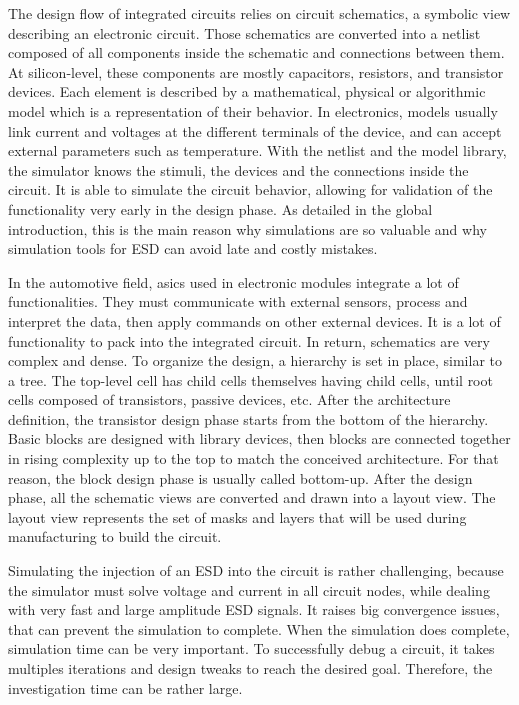The design flow of integrated circuits relies on circuit schematics, a symbolic view describing an electronic circuit.
Those schematics are converted into a netlist composed of all components inside the schematic and connections between them.
At silicon-level, these components are mostly capacitors, resistors, and transistor devices.
Each element is described by a mathematical, physical or algorithmic model which is a representation of their behavior.
In electronics, models usually link current and voltages at the different terminals of the device, and can accept external parameters such as temperature.
With the netlist and the model library, the simulator knows the stimuli, the devices and the connections inside the circuit.
It is able to simulate the circuit behavior, allowing for validation of the functionality very early in the design phase.
As detailed in the global introduction, this is the main reason why simulations are so valuable and why simulation tools for ESD can avoid late and costly mistakes.

In the automotive field, \gls{asic}s used in electronic modules integrate a lot of functionalities.
They must communicate with external sensors, process and interpret the data, then apply commands on other external devices.
It is a lot of functionality to pack into the integrated circuit.
In return, schematics are very complex and dense.
To organize the design, a hierarchy is set in place, similar to a tree.
The top-level cell has child cells themselves having child cells, until root cells composed of transistors, passive devices, etc.
After the architecture definition, the transistor design phase starts from the bottom of the hierarchy.
Basic blocks are designed with library devices, then blocks are connected together in rising complexity up to the top to match the conceived architecture.
For that reason, the block design phase is usually called bottom-up.
After the design phase, all the schematic views are converted and drawn into a layout view.
The layout view represents the set of masks and layers that will be used during manufacturing to build the circuit.

Simulating the injection of an ESD into the circuit is rather challenging, because the simulator must solve voltage and current in all circuit nodes, while dealing with very fast and large amplitude ESD signals.
It raises big convergence issues, that can prevent the simulation to complete.
When the simulation does complete, simulation time can be very important.
To successfully debug a circuit, it takes multiples iterations and design tweaks to reach the desired goal.
Therefore, the investigation time can be rather large.

